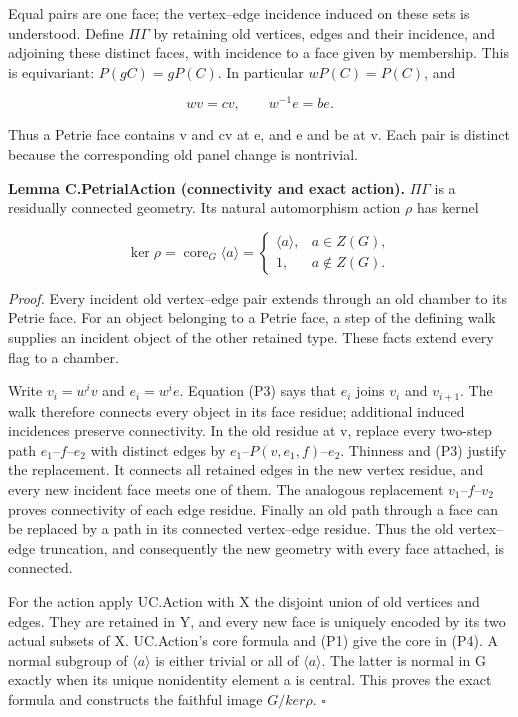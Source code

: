 Equal pairs are one face; the vertex--edge incidence induced on these
sets is understood. Define \(\Pi \Gamma\) by retaining old vertices,
edges and their incidence, and adjoining these distinct faces, with
incidence to a face given by membership. This is equivariant:
\(P(gC)=gP(C)\). In particular \(wP(C)=P(C)\), and

\[
 wv=cv,\qquad w^{-1}e=be.
 \tag{P3}
\]

Thus a Petrie face contains v and cv at e, and e and be at v. Each pair
is distinct because the corresponding old panel change is nontrivial.

\textbf{Lemma C.PetrialAction (connectivity and exact action).}
\(\Pi \Gamma\) is a residually connected geometry. Its natural
automorphism action \(\rho\) has kernel

\[
 \ker\rho=\operatorname{core}_G\langle a\rangle
 =\begin{cases}\langle a\rangle,&a\in Z(G),\\1,&a\notin Z(G).\end{cases}
 \tag{P4}
\]

\emph{Proof.} Every incident old vertex--edge pair extends through an
old chamber to its Petrie face. For an object belonging to a Petrie
face, a step of the defining walk supplies an incident object of the
other retained type. These facts extend every flag to a chamber.

Write \(v_i=w^iv\) and \(e_i=w^ie\). Equation (P3) says that \(e_i\)
joins \(v_i\) and \(v_{i+1}\). The walk therefore connects every object
in its face residue; additional induced incidences preserve
connectivity. In the old residue at v, replace every two-step path
\(e_{1}–f–e_{2}\) with distinct edges by \(e_{1}–P(v,e_{1},f)–e_{2}\).
Thinness and (P3) justify the replacement. It connects all retained
edges in the new vertex residue, and every new incident face meets one
of them. The analogous replacement \(v_{1}–f–v_{2}\) proves connectivity
of each edge residue. Finally an old path through a face can be replaced
by a path in its connected vertex--edge residue. Thus the old
vertex--edge truncation, and consequently the new geometry with every
face attached, is connected.

For the action apply UC.Action with X the disjoint union of old vertices
and edges. They are retained in Y, and every new face is uniquely
encoded by its two actual subsets of X. UC.Action's core formula and
(P1) give the core in (P4). A normal subgroup of \(\langle a\rangle\) is
either trivial or all of \(\langle a\rangle\). The latter is normal in G
exactly when its unique nonidentity element a is central. This proves
the exact formula and constructs the faithful image \(G/ker\rho\).
\(\square\)

